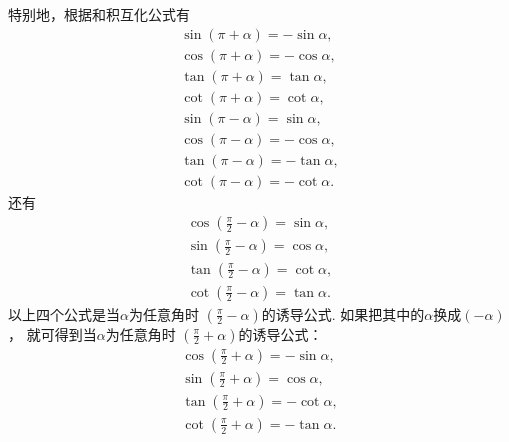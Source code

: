 特别地，根据和积互化公式有
\begin{gather}
	\sin(\pi+\alpha) = -\sin\alpha,
		\label{equation:函数.三角函数.诱导公式1} \\
	\cos(\pi+\alpha) = -\cos\alpha,
		\label{equation:函数.三角函数.诱导公式2} \\
	\tan(\pi+\alpha) = \tan\alpha,
		\label{equation:函数.三角函数.诱导公式3} \\
	\cot(\pi+\alpha) = \cot\alpha,
		\label{equation:函数.三角函数.诱导公式4} \\
	\sin(\pi-\alpha) = \sin\alpha,
		\label{equation:函数.三角函数.诱导公式5} \\
	\cos(\pi-\alpha) = -\cos\alpha,
		\label{equation:函数.三角函数.诱导公式6} \\
	\tan(\pi-\alpha) = -\tan\alpha,
		\label{equation:函数.三角函数.诱导公式7} \\
	\cot(\pi-\alpha) = -\cot\alpha.
		\label{equation:函数.三角函数.诱导公式8}
\end{gather}
还有
\begin{gather}
	\cos\left(\frac{\pi}{2}-\alpha\right) = \sin\alpha,
		\label{equation:函数.三角函数.诱导公式9} \\
	\sin\left(\frac{\pi}{2}-\alpha\right) = \cos\alpha,
		\label{equation:函数.三角函数.诱导公式10} \\
	\tan\left(\frac{\pi}{2}-\alpha\right) = \cot\alpha,
		\label{equation:函数.三角函数.诱导公式11} \\
	\cot\left(\frac{\pi}{2}-\alpha\right) = \tan\alpha.
		\label{equation:函数.三角函数.诱导公式12}
\end{gather}
以上四个公式是当\(\alpha\)为任意角时
\(\left(\frac{\pi}{2}-\alpha\right)\)的诱导公式.
如果把其中的\(\alpha\)换成\((-\alpha)\)，
就可得到当\(\alpha\)为任意角时
\(\left(\frac{\pi}{2}+\alpha\right)\)的诱导公式：
\begin{gather}
	\cos\left(\frac{\pi}{2}+\alpha\right) = -\sin\alpha,
		\label{equation:函数.三角函数.诱导公式13} \\
	\sin\left(\frac{\pi}{2}+\alpha\right) = \cos\alpha,
		\label{equation:函数.三角函数.诱导公式14} \\
	\tan\left(\frac{\pi}{2}+\alpha\right) = -\cot\alpha,
		\label{equation:函数.三角函数.诱导公式15} \\
	\cot\left(\frac{\pi}{2}+\alpha\right) = -\tan\alpha.
		\label{equation:函数.三角函数.诱导公式16}
\end{gather}


